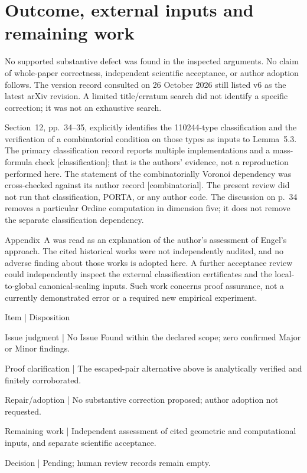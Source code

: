 \documentclass[10pt]{article}
\begin{document}
\section*{Outcome, external inputs and remaining work}
No supported substantive defect was found in the inspected arguments. No claim of whole-paper correctness, independent scientific acceptance, or author adoption follows. The version record consulted on 26 October 2026 still listed v6 as the latest arXiv revision. A limited title/erratum search did not identify a specific correction; it was not an exhaustive search.\par
Section 12, pp. 34–35, explicitly identifies the 110244-type classification and the verification of a combinatorial condition on those types as inputs to Lemma 5.3. The primary classification record reports multiple implementations and a mass-formula check [classification]; that is the authors’ evidence, not a reproduction performed here. The statement of the combinatorially Voronoi dependency was cross-checked against its author record [combinatorial]. The present review did not run that classification, PORTA, or any author code. The discussion on p. 34 removes a particular Ordine computation in dimension five; it does not remove the separate classification dependency.\par
Appendix A was read as an explanation of the author’s assessment of Engel’s approach. The cited historical works were not independently audited, and no adverse finding about those works is adopted here. A further acceptance review could independently inspect the external classification certificates and the local-to-global canonical-scaling inputs. Such work concerns proof assurance, not a currently demonstrated error or a required new empirical experiment.\par
Item | Disposition\par
Issue judgment | No Issue Found within the declared scope; zero confirmed Major or Minor findings.\par
Proof clarification | The escaped-pair alternative above is analytically verified and finitely corroborated.\par
Repair/adoption | No substantive correction proposed; author adoption not requested.\par
Remaining work | Independent assessment of cited geometric and computational inputs, and separate scientific acceptance.\par
Decision | Pending; human review records remain empty.\par
\end{document}

